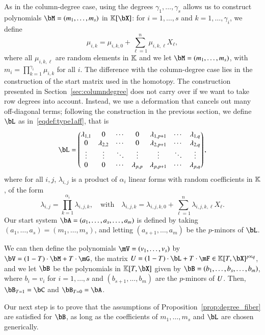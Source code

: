 \documentclass[amsthm]{elsart}
\begin{document}
As in the column-degree case, using the degrees
$\gamma_1,\dots,\gamma_s$ allows us to construct polynomials
$\bM=(m_1,\dots,m_s)$ in $\KK[\bX]$: for $i=1,\dots,s$ and $k=1,\dots,\gamma_i$,
we define
\begin{equation}\label{eqdef:ai}
\mu_{i,k} = \mu_{i,k,0} + \sum_{\ell = 1}^{n}\mu_{i,k,\ell}X_\ell,
\end{equation}
where all $\mu_{i,k,\ell}$ are random elements in $\mathbb{K}$ and we let
$\bM=(m_1,\dots,m_s)$, with $m_i=\prod_{k=1}^{\gamma_i} \mu_{i,k}$ for
all $i$. The difference with the column-degree case lies in the
construction of the start matrix used in the homotopy. The
construction presented in Section~\ref{sec:columndegree} does not
carry over if we want to take row degrees into account. Instead, we
use a deformation that cancels out many off-diagonal terms; following
the construction in the previous section, we define $\bL$ as
in~\eqref{eqdef:type1aff}, that is
\begin{align*}
\bL = \left( \begin{matrix}
\lambda_{1,1} & 0 & \cdots & 0 & \lambda_{1,p+1} & \cdots & \lambda_{1, q}\\
0 & \lambda_{2,2} & \cdots & 0 & \lambda_{2,p+1} & \cdots & \lambda_{2, q}\\
\vdots & \vdots & \ddots & \vdots & \vdots & \ddots & \vdots\\
0 & 0 & \cdots & \lambda_{p,p} & \lambda_{p,p+1} & \cdots & \lambda_{p, q}
\end{matrix} \right), 
\end{align*} 
where for all $i,j$, $\lambda_{i,j}$ is a product of $\alpha_i$ linear
forms with random coefficients in $\mathbb{K}$, of the form
$$\lambda_{i,j}= \prod_{k=1}^{\alpha_i}\lambda_{i,j,k},
\quad\text{with}\quad
\lambda_{i,j,k} =\lambda_{i,j,k,0} + \sum_{\ell=1}^n \lambda_{i,j,k,\ell}X_\ell.
$$ Our start system $\bA=(a_1,\dots,a_s,\dots,a_m)$ is defined by
taking $(a_1,\dots,a_s) = (m_1,\dots,m_s)$, and letting
$(a_{s+1},\dots,a_m)$ be the $p$-minors of $\bL$.

We can then define the polynomials $\mV=(v_1,\dots,v_s)$ by $\bV =
(1-T) \cdot \bM + T \cdot \mG$, the matrix $\mU=(1-T)\cdot \bL + T
\cdot \mF \in \KK[T,\bX]^{p\times q}$, and we let $\bB$ be the
polynomials in $\KK[T,\bX]$ given by $\bB=(b_1,\dots,b_s,\dots,b_m)$,
where $b_i=v_i$ for $i=1,\dots,s$ and $(b_{s+1},\dots,b_{m})$ are the
$p$-minors of ${U}$.  Then, $\bB_{T=1}=\bC$ and $\bB_{T=0}=\bA$.

Our next step is to prove that the assumptions of
Proposition~\ref{prop:degree_fiber} are satisfied for $\bB$, as long
as the coefficients of $m_1,\dots,m_s$ and $\bL$ are chosen
generically.
\end{document}
